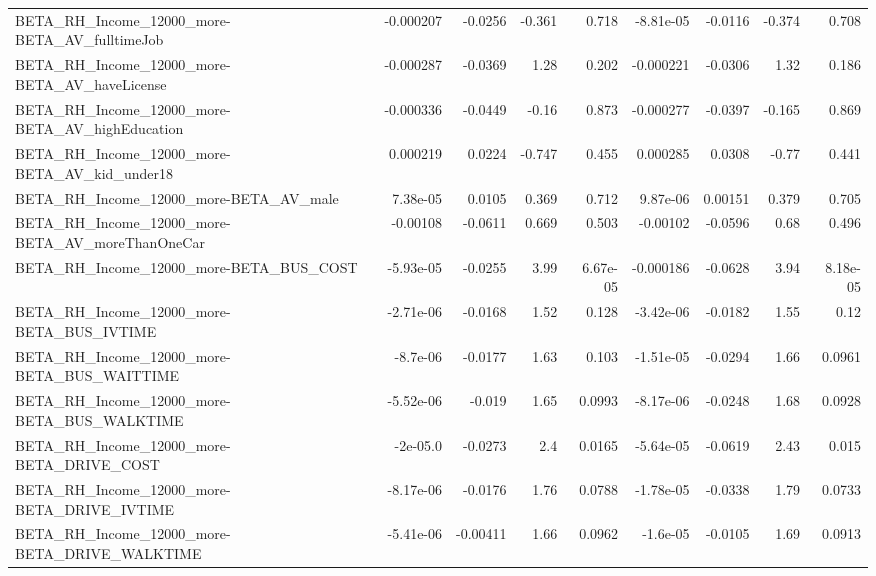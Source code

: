 \begin{tabular}{lrrrrrrrr}
BETA\_RH\_Income\_12000\_more-BETA\_AV\_fulltimeJob      &   -0.000207 &      -0.0256 &   -0.361 &    0.718 &  -8.81e-05 &     -0.0116 &       -0.374 &         0.708 \\
BETA\_RH\_Income\_12000\_more-BETA\_AV\_haveLicense      &   -0.000287 &      -0.0369 &     1.28 &    0.202 &  -0.000221 &     -0.0306 &         1.32 &         0.186 \\
BETA\_RH\_Income\_12000\_more-BETA\_AV\_highEducation    &   -0.000336 &      -0.0449 &    -0.16 &    0.873 &  -0.000277 &     -0.0397 &       -0.165 &         0.869 \\
BETA\_RH\_Income\_12000\_more-BETA\_AV\_kid\_under18      &    0.000219 &       0.0224 &   -0.747 &    0.455 &   0.000285 &      0.0308 &        -0.77 &         0.441 \\
BETA\_RH\_Income\_12000\_more-BETA\_AV\_male             &    7.38e-05 &       0.0105 &    0.369 &    0.712 &   9.87e-06 &     0.00151 &        0.379 &         0.705 \\
BETA\_RH\_Income\_12000\_more-BETA\_AV\_moreThanOneCar   &    -0.00108 &      -0.0611 &    0.669 &    0.503 &   -0.00102 &     -0.0596 &         0.68 &         0.496 \\
BETA\_RH\_Income\_12000\_more-BETA\_BUS\_COST            &   -5.93e-05 &      -0.0255 &     3.99 & 6.67e-05 &  -0.000186 &     -0.0628 &         3.94 &      8.18e-05 \\
BETA\_RH\_Income\_12000\_more-BETA\_BUS\_IVTIME          &   -2.71e-06 &      -0.0168 &     1.52 &    0.128 &  -3.42e-06 &     -0.0182 &         1.55 &          0.12 \\
BETA\_RH\_Income\_12000\_more-BETA\_BUS\_WAITTIME        &    -8.7e-06 &      -0.0177 &     1.63 &    0.103 &  -1.51e-05 &     -0.0294 &         1.66 &        0.0961 \\
BETA\_RH\_Income\_12000\_more-BETA\_BUS\_WALKTIME        &   -5.52e-06 &       -0.019 &     1.65 &   0.0993 &  -8.17e-06 &     -0.0248 &         1.68 &        0.0928 \\
BETA\_RH\_Income\_12000\_more-BETA\_DRIVE\_COST          &    -2e-05.0 &      -0.0273 &      2.4 &   0.0165 &  -5.64e-05 &     -0.0619 &         2.43 &         0.015 \\
BETA\_RH\_Income\_12000\_more-BETA\_DRIVE\_IVTIME        &   -8.17e-06 &      -0.0176 &     1.76 &   0.0788 &  -1.78e-05 &     -0.0338 &         1.79 &        0.0733 \\
BETA\_RH\_Income\_12000\_more-BETA\_DRIVE\_WALKTIME      &   -5.41e-06 &     -0.00411 &     1.66 &   0.0962 &   -1.6e-05 &     -0.0105 &         1.69 &        0.0913 \\

\end{tabular}
